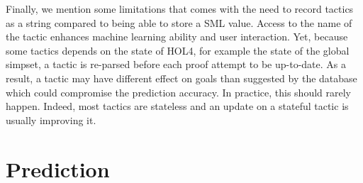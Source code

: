 \documentclass[runningheads,a4paper,draft]{svjour3}
\def\holfour{\textsf{HOL4}\xspace}
\def\hollight{\textsf{HOL Light}\xspace}
\def\sml{\textsf{SML}\xspace}
\begin{document}
%

Finally, we mention some limitations that comes with 
the need to record tactics as a string compared to being able to store a \sml 
value. Access to the name of the tactic enhances machine 
learning ability and user interaction. Yet, because some tactics 
depends on the state of \holfour, for example the state of the global 
simpset, a tactic is re-parsed before each proof attempt to be up-to-date.
As a result, a tactic may have different effect on goals than suggested by the 
database which could compromise the prediction accuracy. In practice, this 
should rarely happen. Indeed, most tactics are stateless and an update on a 
stateful tactic is usually improving it.






\section{Prediction}\label{s:prediction}
\end{document}
